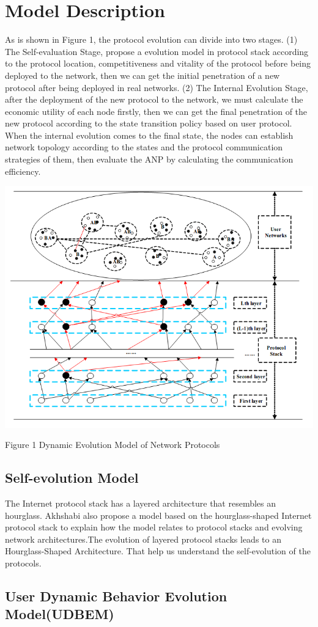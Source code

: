 \documentclass{article}
\begin{document}
\section{Model Description}
As is shown in Figure 1, the protocol evolution can divide into two stages. (1) The Self-evaluation Stage, propose a
evolution model in protocol stack according to the protocol location, competitiveness and vitality of the protocol
before being deployed to the network, then we can get the initial penetration of a new protocol after being deployed
in real networks. (2) The Internal Evolution Stage, after the deployment of the new protocol to the network, we must
calculate the economic utility of each node firstly, then we can get the final penetration of the new protocol
according to the state transition policy based on user protocol. When the internal evolution comes to the final state,
the nodes can establish network topology according to the states and the protocol communication strategies of them,
then evaluate the ANP by calculating the communication efficiency.


\par
\centerline{\includegraphics[width=.45\textwidth]{Figure1.png}}
\centerline{Figure 1 Dynamic Evolution Model of Network Protocols}


\subsection{Self-evolution Model}
The Internet protocol stack has a layered architecture that resembles an hourglass. Akhshabi also propose a model based
on the hourglass-shaped Internet protocol stack to explain how the model relates to protocol stacks and evolving network
architectures.The evolution of layered protocol stacks leads to an Hourglass-Shaped Architecture. That help us understand
the self-evolution of the protocols.

\subsection{User Dynamic Behavior Evolution Model(UDBEM)}
\end{document}
